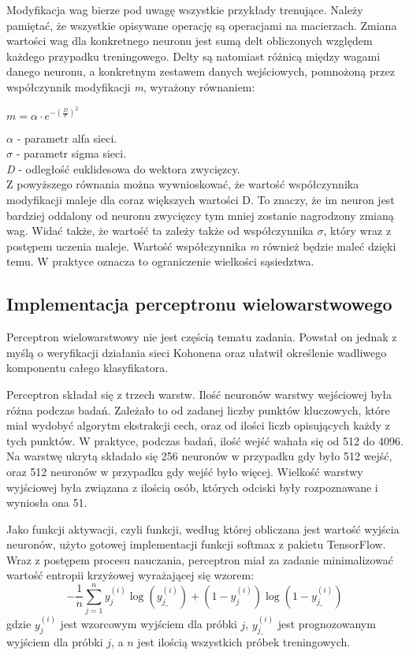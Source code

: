 \documentclass[12pt, notitlepage]{article}
\begin{document}
Modyfikacja wag bierze pod uwagę wszystkie przykłady trenujące. Należy pamiętać, że wszystkie opisywane operację są operacjami na macierzach. Zmiana wartości wag dla konkretnego neuronu jest sumą delt obliczonych względem każdego przypadku treningowego. Delty są natomiast różnicą między wagami danego neuronu, a konkretnym zestawem danych wejściowych, pomnożoną przez współczynnik modyfikacji \textit{m}, wyrażony równaniem:
\begin{center}
    $ m = \alpha \cdot e^{-(\frac{D}{\sigma})^2} $ \\
\end{center}
$\alpha$ - parametr alfa sieci. \\
$\sigma$ - parametr sigma sieci. \\
\textit{D} - odległość euklidesowa do wektora zwycięzcy. \\
Z powyższego równania można wywnioskować, że wartość współczynnika modyfikacji maleje dla coraz większych wartości D. To znaczy, że im neuron jest bardziej oddalony od neuronu zwycięzcy tym mniej zostanie nagrodzony zmianą wag. Widać także, że wartość ta zależy także od współczynnika $\sigma$, który wraz z postępem uczenia maleje. Wartość współczynnika \textit{m} również będzie maleć dzięki temu. W praktyce oznacza to ograniczenie wielkości sąsiedztwa.

\subsection{Implementacja perceptronu wielowarstwowego}\label{sec:perceptron}

Perceptron wielowarstwowy nie jest częścią tematu zadania. Powstał on jednak z myślą o weryfikacji działania sieci Kohonena oraz ułatwił określenie wadliwego komponentu całego klasyfikatora.

Perceptron składał się z trzech warstw. Ilość neuronów warstwy wejściowej była różna podczas badań. Zależało to od zadanej liczby punktów kluczowych, które miał wydobyć algorytm ekstrakcji cech, oraz od ilości liczb opisujących każdy z tych punktów. W praktyce, podczas badań, ilość wejść wahała się od 512 do 4096. Na warstwę ukrytą składało się 256 neuronów w przypadku gdy było 512 wejść, oraz 512 neuronów w przypadku gdy wejść było więcej. Wielkość warstwy wyjściowej była związana z ilością osób, których odciski były rozpoznawane i wyniosła ona 51.

Jako funkcji aktywacji, czyli funkcji, według której obliczana jest wartość wyjścia neuronów, użyto gotowej implementacji funkcji softmax\cite{softmax} z pakietu TensorFlow. Wraz z postępem procesu nauczania, perceptron miał za zadanie minimalizować wartość entropii krzyżowej wyrażającej się wzorem: $$-\frac{1}{n}\sum_{j=1}^{n}y_j^{(i)}\log(y_{j\_}^{(i)}) + (1  - y_j^{(i)})\log(1 - y_{j\_}^{(i)})$$
gdzie $y_j^{(i)}$ jest wzorcowym wyjściem dla próbki $j$, $y_{j\_}^{(i)}$ jest prognozowanym wyjściem dla próbki $j$, a $n$ jest ilością wszystkich próbek treningowych.
\end{document}
